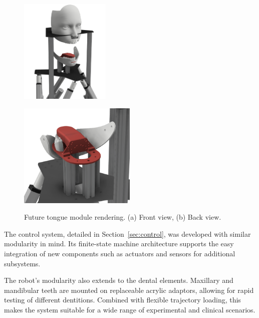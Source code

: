 \begin{figure}[H]
\centering
\begin{minipage}{.45\textwidth}
  \centering
  \includegraphics[height=5cm]{figures/tongue_front.png}
  \subcaption{}
  \label{fig:tongue_front}
\end{minipage}
\begin{minipage}{.45\textwidth}
  \centering
  \includegraphics[height=5cm]{figures/tongue_back.png}
  \subcaption{}
  \label{fig:tongue_back}
\end{minipage}
\caption{Future tongue module rendering. (a) Front view, (b) Back view. }
\label{fig:tongue}
\end{figure}

The control system, detailed in Section~\ref{sec:control}, was developed with similar modularity in mind. Its finite-state machine architecture supports 
the easy integration of new components such as actuators and sensors for additional subsystems.

The robot's modularity also extends to the dental elements. Maxillary and mandibular teeth are mounted on replaceable acrylic adaptors, allowing for 
rapid testing of different dentitions. Combined with flexible trajectory loading, this makes the system suitable for a wide range of experimental and clinical scenarios.
